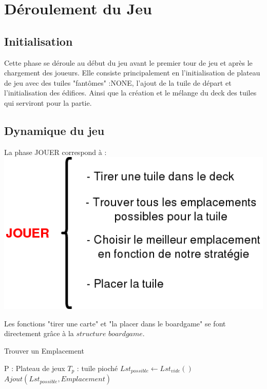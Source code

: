 \section{Déroulement du Jeu}



\subsection{Initialisation }

\indent Cette phase se déroule au début du jeu avant le premier tour de jeu et après le chargement des joueurs. Elle consiste principalement en l'initialisation de plateau de jeu avec des tuiles "fantômes" :NONE, l'ajout de la tuile de départ et l'initialisation des édifices. Ainsi que la création et le mélange du deck des tuiles qui serviront pour la partie.

\subsection{Dynamique du jeu}
\indent La phase JOUER correspond à :
\\

\includegraphics[scale=0.5]{Jouer.png}

Les fonctions "tirer une carte" et "la placer dans le boardgame" se font directement grâce à la $structure$ $boardgame$. \\


\begin{algorithm}[!h]
\caption{ Trouver un Emplacement }
\begin{algorithmic} [!h]
\REQUIRE  P : Plateau de jeux
\REQUIRE  $T_p $ : tuile pioché
\STATE $Lst_{possible} \leftarrow Lst_{vide}()$
\STATE $Ajout(Lst_{possible},Emplacement)$
\ENDIF
\ENDFOR
\end{algorithmic}
\end{algorithm}

